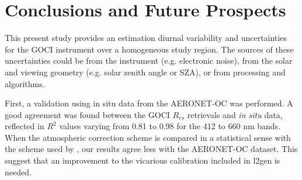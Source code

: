 \documentclass[onecolumn,3p,letterpaper,11pt]{elsarticle}
\begin{document}
\section{Conclusions and Future Prospects} 




This present study provides an estimation diurnal variability and uncertainties for the GOCI instrument over a homogeneous study region. 
The sources of these uncertainties could be from the instrument (e.g. electronic noise), from the solar and viewing geometry (e.g. solar zenith angle or SZA), or from processing and algorithms.

First, a validation using in situ data from the AERONET-OC was performed.
A good agreement was found between the GOCI $R_{rs}$ retrievals and {\it in situ} data, reflected in $R^2$ values varying from 0.81 to 0.98 for the 412 to 660 nm bands.
When the atmospheric correction scheme is compared in a statistical sense with the scheme used by \citet{Ahn2015}, our results agree less with the AERONET-OC dataset. 
This suggest that an improvement to the vicarious calibration included in l2gen is needed.
\end{document}
